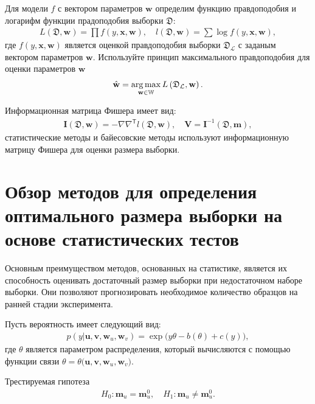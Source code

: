 Для модели $f$ с вектором параметров $\textbf{w}$ определим функцию правдоподобия и логарифм функции прадоподобия выборки $\mathfrak{D}$:
\[
\label{eq:ps:4}
\begin{aligned}
	L\left(\mathfrak{D}, \textbf{w}\right) = \prod f\left(y,\textbf{x}, \textbf{w}\right),\quad l\left(\mathfrak{D}, \textbf{w}\right) = \sum \log f\left(y,\textbf{x}, \textbf{w}\right),
\end{aligned}
\]
где $f(y,\textbf{x}, \textbf{w})$ является оценкой правдоподобия выборки $\mathfrak{D}_{\mathcal{L}}$ с заданым вектором параметров $\textbf{w}$.
Используйте принцип максимального правдоподобия для оценки параметров $\textbf{w}$
\[
\label{eq:ps:5}
\begin{aligned}
	\hat{\textbf{w}} = \operatorname*{arg\,max}_{\textbf{w}\in\mathbb{W}}L\left(\mathfrak{D}_{\mathcal{L}}, \textbf{w}\right).
\end{aligned}
\]

Информационная матрица Фишера имеет вид:
\[
\label{eq:ps:6}
\begin{aligned}
	\textbf{I}\left(\mathfrak{D}, \textbf{w}\right) = -\nabla\nabla^{\mathsf{T}}l\left(\mathfrak{D}, \textbf{w}\right), \quad  \textbf{V} = \textbf{I}^{-1}\left(\mathfrak{D}, \textbf{m}\right),
\end{aligned}
\]
статистические методы и байесовские методы используют информационную матрицу Фишера для оценки размера выборки.

\section{Обзор методов для определения оптимального размера выборки на основе статистических тестов}
Основным преимуществом методов, основанных на статистике, является их способность оценивать достаточный размер выборки при недостаточном наборе выборки. Они позволяют прогнозировать необходимое количество образцов на ранней стадии эксперимента.

Пусть вероятность имеет следующий вид:
\[
\label{eq:sb:1}
\begin{aligned}
	p(y|\textbf{u},\textbf{v},\textbf{w}_{u},\textbf{w}_{v}) = \exp\bigl(y\theta- b(\theta) + c\left(y\right)\bigr),
\end{aligned}
\]
где $\theta$ является параметром распределения, который вычисляются с помощью функции связи $\theta=\theta\bigr(\textbf{u},\textbf{v},\textbf{w}_{u},\textbf{w}_{v}\bigr)$.

Трестируемая гипотеза
\[
\label{eq:sb:2}
\begin{aligned}
	H_0: \textbf{m}_{u} = \textbf{m}^0_{u}, \quad H_1: \textbf{m}_{u} \not= \textbf{m}^0_{u}.
\end{aligned}
\]

